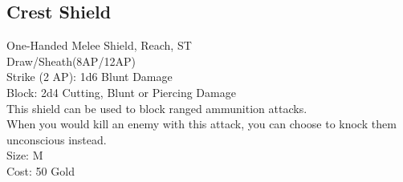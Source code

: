 \subsection{Crest Shield}\label{weapon:crestShield}
One-Handed Melee Shield,  Reach, ST\\
Draw/Sheath(8AP/12AP)\\
Strike (2 AP): 1d6 Blunt Damage\\
Block: 2d4 Cutting, Blunt or Piercing Damage\\
This shield can be used to block ranged ammunition attacks.\\
When you would kill an enemy with this attack, you can choose to knock them unconscious instead.\\
Size: M\\
Cost: 50 Gold\\